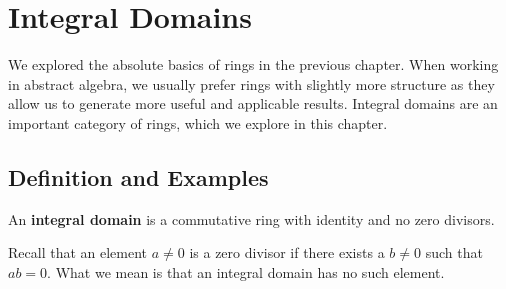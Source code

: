 \chapter{Integral Domains}
We explored the absolute basics of rings in the previous chapter. When working in abstract algebra, we usually prefer rings with slightly more structure as they allow us to generate more useful and applicable results. Integral domains are an important category of rings, which we explore in this chapter.

\section{Definition and Examples}
\begin{definition}
    An \textbf{integral domain} is a commutative ring with identity and no zero divisors.
\end{definition}
Recall that an element $a \neq 0$ is a zero divisor if there exists a $b \neq 0$ such that $ab = 0$. What we mean is that an integral domain has no such element.

